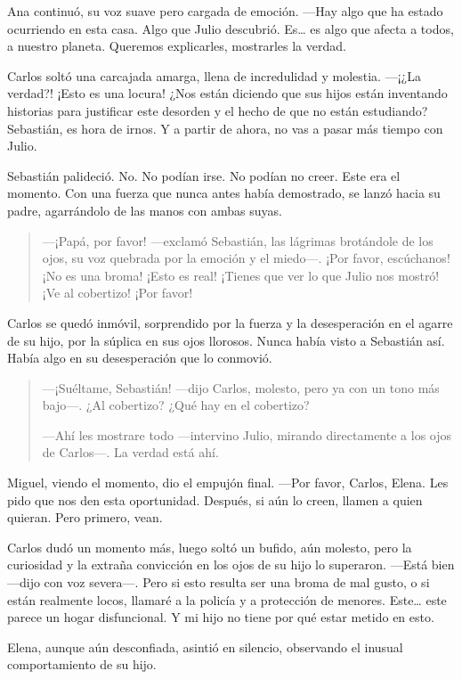 \documentclass[a4paper,12pt]{book}
\begin{document}
Ana continuó, su voz suave pero cargada de emoción. —Hay algo que ha estado ocurriendo en esta casa. Algo que Julio descubrió. Es… es algo que afecta a todos, a nuestro planeta. Queremos explicarles, mostrarles la verdad.

Carlos soltó una carcajada amarga, llena de incredulidad y molestia. —¡¿La verdad?! ¡Esto es una locura! ¿Nos están diciendo que sus hijos están inventando historias para justificar este desorden y el hecho de que no están estudiando? Sebastián, es hora de irnos. Y a partir de ahora, no vas a pasar más tiempo con Julio.

Sebastián palideció. No. No podían irse. No podían no creer. Este era el momento. Con una fuerza que nunca antes había demostrado, se lanzó hacia su padre, agarrándolo de las manos con ambas suyas.

\begin{quote}
    —¡Papá, por favor! —exclamó Sebastián, las lágrimas brotándole de los ojos, su voz quebrada por la emoción y el miedo—. ¡Por favor, escúchanos! ¡No es una broma! ¡Esto es real! ¡Tienes que ver lo que Julio nos mostró! ¡Ve al cobertizo! ¡Por favor!
\end{quote}

Carlos se quedó inmóvil, sorprendido por la fuerza y la desesperación en el agarre de su hijo, por la súplica en sus ojos llorosos. Nunca había visto a Sebastián así. Había algo en su desesperación que lo conmovió.

\begin{quote}
    —¡Suéltame, Sebastián! —dijo Carlos, molesto, pero ya con un tono más bajo—. ¿Al cobertizo? ¿Qué hay en el cobertizo?

    —Ahí les mostrare todo —intervino Julio, mirando directamente a los ojos de Carlos—. La verdad está ahí.
\end{quote}

Miguel, viendo el momento, dio el empujón final. —Por favor, Carlos, Elena. Les pido que nos den esta oportunidad. Después, si aún lo creen, llamen a quien quieran. Pero primero, vean.

Carlos dudó un momento más, luego soltó un bufido, aún molesto, pero la curiosidad y la extraña convicción en los ojos de su hijo lo superaron. —Está bien —dijo con voz severa—. Pero si esto resulta ser una broma de mal gusto, o si están realmente locos, llamaré a la policía y a protección de menores. Este… este parece un hogar disfuncional. Y mi hijo no tiene por qué estar metido en esto.

Elena, aunque aún desconfiada, asintió en silencio, observando el inusual comportamiento de su hijo.
\end{document}
